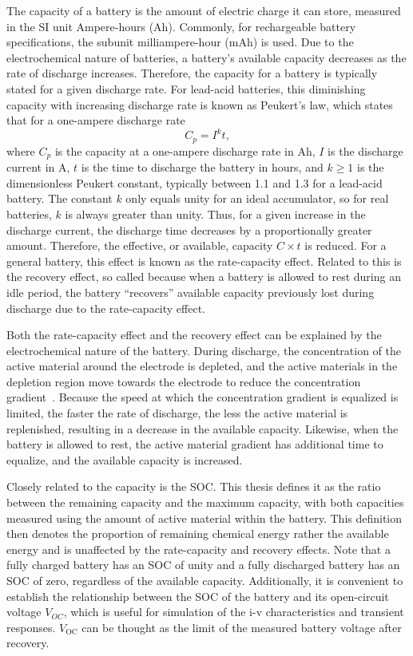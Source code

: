 \documentclass[../zhang_thesis.tex]{subfiles}
\begin{document}
The capacity of a battery is the amount of electric charge it can store, measured in the SI unit Ampere-hours (Ah). Commonly, for rechargeable battery specifications, the subunit milliampere-hour (mAh) is used. Due to the electrochemical nature of batteries, a battery's available capacity decreases as the rate of discharge increases. Therefore, the capacity for a battery is typically stated for a given discharge rate. For lead-acid batteries, this diminishing capacity with increasing discharge rate is known as Peukert's law, which states that for a one-ampere discharge rate~\cite{doerffel06}
\begin{equation}
C_p = I^k t,
\end{equation}
where $C_p$ is the capacity at a one-ampere discharge rate in Ah, $I$ is the discharge current in A, $t$ is the time to discharge the battery in hours, and $k\ge 1$ is the dimensionless Peukert constant, typically between 1.1 and 1.3 for a lead-acid battery. The constant $k$ only equals unity for an ideal accumulator, so for real batteries, $k$ is always greater than unity. Thus, for a given increase in the discharge current, the discharge time decreases by a proportionally greater
amount. Therefore, the effective, or available, capacity $C\times t$ is reduced. For a general battery, this effect is known as the rate-capacity effect. Related to this is the recovery effect, so called because when a battery is allowed to rest during an idle period, the battery ``recovers'' available capacity previously lost during discharge due to the rate-capacity effect.

Both the rate-capacity effect and the recovery effect can be explained by the electrochemical nature of the battery. During discharge, the concentration of the active material around the electrode is depleted, and the active materials in the depletion region move towards the electrode to reduce the concentration gradient~\cite{chiasserini99}. Because the speed at which the concentration gradient is equalized is limited, the faster the rate of discharge, the less the active material is
replenished, resulting in a decrease in the available capacity. Likewise, when the battery is allowed to rest, the active material gradient has additional time to equalize, and the available capacity is increased.

Closely related to the capacity is the SOC. This thesis defines it as the ratio between the remaining capacity and the maximum capacity, with both capacities measured using the amount of active material within the battery. This definition then denotes the proportion of remaining chemical energy rather the available energy and is unaffected by the rate-capacity and recovery effects. Note that a fully charged battery has an SOC of unity and a fully discharged battery has an SOC of
zero, regardless of the available capacity. Additionally, it is convenient to establish the relationship between the SOC of the battery and its open-circuit voltage $V_{OC}$, which is useful for simulation of the i-v characteristics and transient responses. $V_\text{OC}$ can be thought as the limit of the measured battery voltage after recovery.
\end{document}
